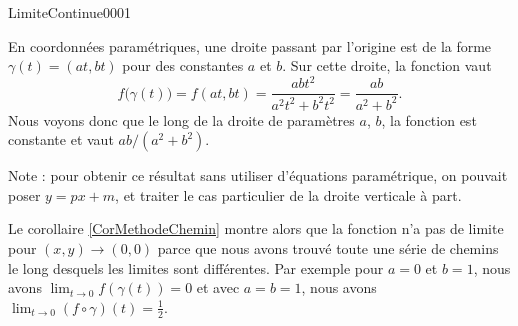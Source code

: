 \begin{corrige}{LimiteContinue0001}

	En coordonnées paramétriques, une droite passant par l'origine est de la forme $\gamma(t)=(at,bt)$ pour des constantes $a$ et $b$. Sur cette droite, la fonction vaut
	\begin{equation}
		f\big( \gamma(t) \big)=f(at,bt)=\frac{ abt^2 }{ a^2t^2+b^2t^2 }=\frac{ ab }{ a^2+b^2 }.
	\end{equation}
	Nous voyons donc que le long de la droite de paramètres $a$, $b$, la fonction est constante et vaut $ab/(a^2+b^2)$.
	
	Note : pour obtenir ce résultat sans utiliser d'équations paramétrique, on pouvait poser $y=px+m$, et traiter le cas particulier de la droite verticale à part.

	Le corollaire \ref{CorMethodeChemin} montre alors que la fonction n'a pas de limite pour $(x,y)\to (0,0)$ parce que nous avons trouvé toute une série de chemins le long desquels les limites sont différentes. Par exemple pour $a=0$ et $b=1$, nous avons $\lim_{t\to 0} f(\gamma(t))=0$ et avec $a=b=1$, nous avons $\lim_{t\to 0} (f\circ\gamma)(t)=\frac{ 1 }{2}$.

\end{corrige}
